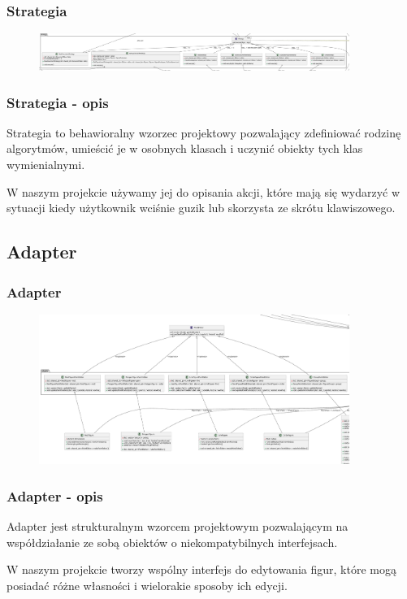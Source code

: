 \documentclass[
	11pt,]{beamer}
\begin{document}
\begin{frame}
	\frametitle{Strategia}
	
	\begin{figure}
		\includegraphics[width=0.9\textwidth]{figures/strategy.pdf}
	\end{figure}
\end{frame}

\begin{frame}
	\frametitle{Strategia - opis}
	Strategia to behawioralny wzorzec projektowy pozwalający zdefiniować rodzinę algorytmów, umieścić je w osobnych klasach i uczynić obiekty tych klas wymienialnymi.
	
	\vfill
	
	W naszym projekcie używamy jej do opisania akcji, które mają się wydarzyć w sytuacji kiedy użytkownik wciśnie guzik lub skorzysta ze skrótu klawiszowego.
	
\end{frame}

\subsection{Adapter}

\begin{frame}
	\frametitle{Adapter}
	
	\begin{figure}
		\includegraphics[width=0.9\textwidth]{figures/adapter.pdf}
	\end{figure}
\end{frame}

\begin{frame}
	\frametitle{Adapter - opis}
	Adapter jest strukturalnym wzorcem projektowym pozwalającym na współdziałanie ze sobą obiektów o niekompatybilnych interfejsach.
	
	\vfill
	
	W naszym projekcie tworzy wspólny interfejs do edytowania figur, które mogą posiadać różne własności i wielorakie sposoby ich edycji.
\end{frame}
\end{document}
